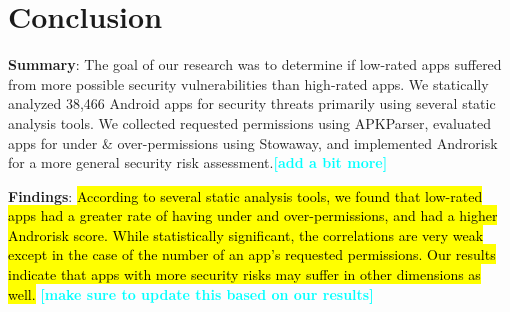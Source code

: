 \documentclass{sig-alternate-05-2015}
\newcommand{\todo}[1]{\textcolor{cyan}{\textbf{[#1]}}}
\begin{document}
\section{Conclusion}
\label{sec:conclusion}

\noindent \textbf{Summary}:
The goal of our research was to determine if low-rated apps suffered from more possible security vulnerabilities than high-rated apps. We statically analyzed 38,466 Android apps for security threats primarily using several static analysis tools. We collected requested permissions using APKParser, evaluated apps for under \& over-permissions using Stowaway, and implemented Androrisk for a more general security risk assessment.\todo{add a bit more}

\noindent \textbf{Findings}: \hl{According to several static analysis tools, we found that low-rated apps had a greater rate of having under and over-permissions, and had a higher Androrisk score. While statistically significant, the correlations are very weak except in the case of the number of an app's requested permissions. Our results indicate that apps with more security risks may suffer in other dimensions as well.}
\todo{make sure to update this based on our results}







%
%

\balance


\end{document}
